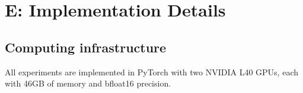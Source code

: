 \documentclass[letterpaper]{article} %
\begin{document}



% 





\section{E: Implementation Details}

\subsection{Computing infrastructure}

All experiments are implemented in PyTorch with two NVIDIA L40 GPUs, each with 46GB of memory  and bfloat16 precision.  
\end{document}
